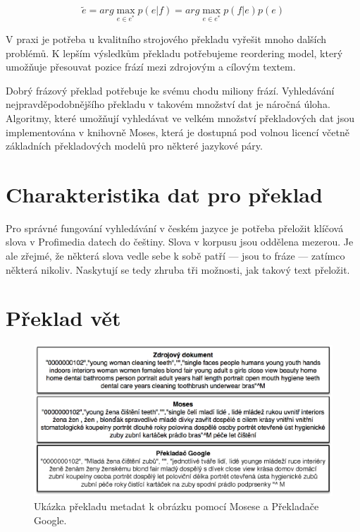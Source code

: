 \begin{equation}
 \tilde{e} = arg \max_{e \in e^*} p(e|f) = arg \max_{e\in e^*} p(f|e) p(e) 
\end{equation}

V praxi je potřeba u kvalitního strojového překladu vyřešit mnoho dalších problémů. K lepším výsledkům překladu potřebujeme reordering model, který umožňuje přesouvat pozice frází mezi zdrojovým a cílovým textem. 

Dobrý frázový překlad potřebuje ke svému chodu miliony frází. Vyhledávání nejpravděpodobnějšího překladu v takovém množství dat je náročná úloha. Algoritmy, které umožňují vyhledávat ve velkém množství překladových dat jsou implementována v knihovně Moses\cite{moses}, která je dostupná pod volnou licencí včetně základních překladových modelů pro některé jazykové páry.

\section{Charakteristika dat pro překlad}

Pro správné fungování vyhledávání v českém jazyce je potřeba přeložit klíčová slova v Profimedia datech do češtiny. Slova v korpusu jsou oddělena mezerou. Je ale zřejmé, že některá slova vedle sebe k sobě patří --- jsou to fráze --- zatímco některá nikoliv. Naskytují se tedy zhruba tři možnosti, jak takový text přeložit.


\section{Překlad vět}

\begin{figure}[h]
  \centering
  \includegraphics[width=150mm]{translate.eps}
  \caption{Ukázka překladu metadat k obrázku pomocí Mosese a Překladače Google.}
  \label{fig:translate}
\end{figure}

